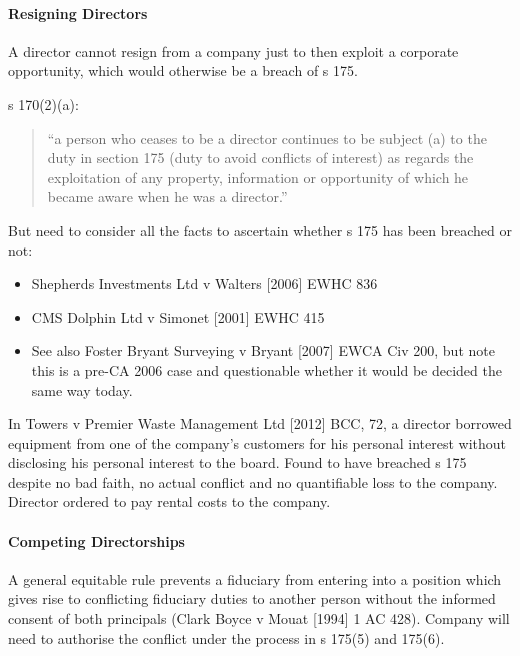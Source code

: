 \documentclass[
]{article}
\providecommand{\tightlist}{%
  \setlength{\itemsep}{0pt}\setlength{\parskip}{0pt}}
\begin{document}
\hypertarget{resigning-directors}{%
\paragraph{Resigning Directors}\label{resigning-directors}}

A director cannot resign from a company just to then exploit a corporate
opportunity, which would otherwise be a breach of s 175.

s 170(2)(a):

\begin{quote}
``a person who ceases to be a director continues to be subject (a) to
the duty in section 175 (duty to avoid conflicts of interest) as regards
the exploitation of any property, information or opportunity of which he
became aware when he was a director.''
\end{quote}

But need to consider all the facts to ascertain whether s 175 has been
breached or not:

\begin{itemize}
\tightlist
\item
  Shepherds Investments Ltd v Walters {[}2006{]} EWHC 836
\item
  CMS Dolphin Ltd v Simonet {[}2001{]} EWHC 415
\item
  See also Foster Bryant Surveying v Bryant {[}2007{]} EWCA Civ 200, but
  note this is a pre-CA 2006 case and questionable whether it would be
  decided the same way today.
\end{itemize}

In Towers v Premier Waste Management Ltd {[}2012{]} BCC, 72, a director
borrowed equipment from one of the company's customers for his personal
interest without disclosing his personal interest to the board. Found to
have breached s 175 despite no bad faith, no actual conflict and no
quantifiable loss to the company. Director ordered to pay rental costs
to the company.

\hypertarget{competing-directorships}{%
\paragraph{Competing Directorships}\label{competing-directorships}}

A general equitable rule prevents a fiduciary from entering into a
position which gives rise to conflicting fiduciary duties to another
person without the informed consent of both principals (Clark Boyce v
Mouat {[}1994{]} 1 AC 428). Company will need to authorise the conflict
under the process in s 175(5) and 175(6).
\end{document}
